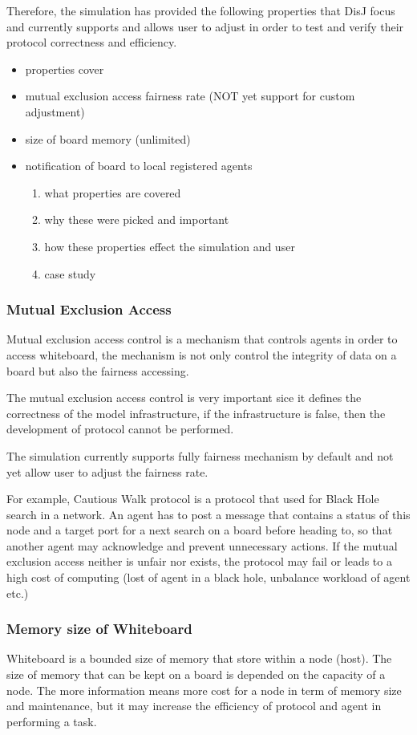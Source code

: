 Therefore, the simulation has provided the following properties that DisJ focus and currently supports and allows user to adjust in order to test and verify their protocol correctness and efficiency.

\begin{itemize}
\item properties cover
\item mutual exclusion access fairness rate (NOT yet support for custom adjustment)
\item size of board memory (unlimited)
\item notification of board to local registered agents
    \begin{enumerate}
    \item what properties are covered
    \item why these were picked and important
    \item how these properties effect the simulation and user
    \item case study
    \end{enumerate}
\end{itemize}


\subsubsection*{Mutual Exclusion Access}
Mutual exclusion access control is a mechanism that controls agents in order to access whiteboard, the mechanism is not only control the integrity of data on a board but also the fairness accessing.

The mutual exclusion access control is very important sice it defines the correctness of the model infrastructure, if the infrastructure is false, then the development of protocol cannot be performed.

The simulation currently supports fully fairness mechanism by default and not yet allow user to adjust the fairness rate.

For example, Cautious Walk protocol is a protocol that used for Black Hole search in a network. An agent has to post a message that contains a status of this node and a target port for a next search on a board before heading to, so that another agent may acknowledge and prevent unnecessary actions. If the mutual exclusion access neither is unfair nor exists, the protocol may fail or leads to a high cost of computing (lost of agent in a black hole, unbalance workload of agent etc.)


\subsubsection*{Memory size of Whiteboard}
Whiteboard is a bounded size of memory that store within a node (host). The size of memory that can be kept on a board is depended on the capacity of a node. The more information means more cost for a node in term of memory size and maintenance, but it may increase the efficiency of protocol and agent in performing a task.

